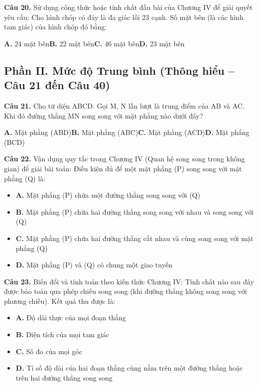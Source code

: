 \documentclass[11pt,a4paper]{article}
\begin{document}
\textbf{\color{primary} Câu 20.} Sử dụng công thức hoặc tính chất đầu bài của Chương IV để giải quyết yêu cầu: Cho hình chóp có đáy là đa giác lồi 23 cạnh. Số mặt bên (là các hình tam giác) của hình chóp đó bằng:\par
\hspace*{1.5em}\textbf{A.} 24 mặt bên\quad\quad \textbf{B.} 22 mặt bên\quad\quad \textbf{C.} 46 mặt bên\quad\quad \textbf{D.} 23 mặt bên\par\vspace{2pt}
\subsection*{\color{accent} Phần II. Mức độ Trung bình (Thông hiểu -- Câu 21 đến Câu 40)}
\textbf{\color{primary} Câu 21.} Cho tứ diện ABCD. Gọi M, N lần lượt là trung điểm của AB và AC. Khi đó đường thẳng MN song song với mặt phẳng nào dưới đây?\par
\hspace*{1.5em}\textbf{A.} Mặt phẳng (ABD)\quad\quad \textbf{B.} Mặt phẳng (ABC)\quad\quad \textbf{C.} Mặt phẳng (ACD)\quad\quad \textbf{D.} Mặt phẳng (BCD)\par\vspace{2pt}
\textbf{\color{primary} Câu 22.} Vận dụng quy tắc trong Chương IV (Quan hệ song song trong không gian) để giải bài toán: Điều kiện đủ để một mặt phẳng (P) song song với mặt phẳng (Q) là:\par
\begin{itemize}\setlength{\itemsep}{1pt}\setlength{\parskip}{0pt}
  \item[] \textbf{A.} Mặt phẳng (P) chứa một đường thẳng song song với (Q)
  \item[] \textbf{B.} Mặt phẳng (P) chứa hai đường thẳng song song với nhau và song song với (Q)
  \item[] \textbf{C.} Mặt phẳng (P) chứa hai đường thẳng cắt nhau và cùng song song với mặt phẳng (Q)
  \item[] \textbf{D.} Mặt phẳng (P) và (Q) có chung một giao tuyến
\end{itemize}\vspace{2pt}
\textbf{\color{primary} Câu 23.} Biến đổi và tính toán theo kiến thức Chương IV: Tính chất nào sau đây được bảo toàn qua phép chiếu song song (khi đường thẳng không song song với phương chiếu). Kết quả thu được là:\par
\begin{itemize}\setlength{\itemsep}{1pt}\setlength{\parskip}{0pt}
  \item[] \textbf{A.} Độ dài thực của mọi đoạn thẳng
  \item[] \textbf{B.} Diện tích của mọi tam giác
  \item[] \textbf{C.} Số đo của mọi góc
  \item[] \textbf{D.} Tỉ số độ dài của hai đoạn thẳng cùng nằm trên một đường thẳng hoặc trên hai đường thẳng song song
\end{itemize}\vspace{2pt}
\end{document}

